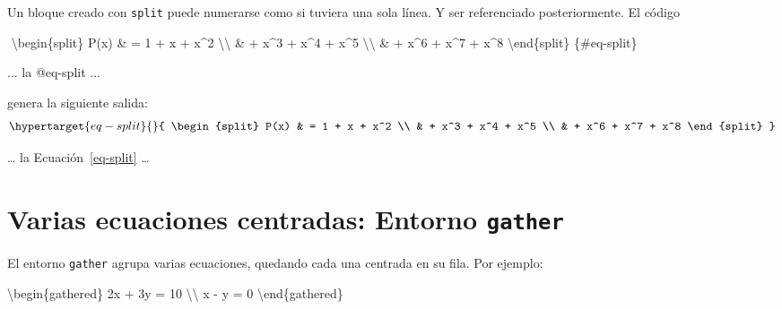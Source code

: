 \documentclass[
  letterpaper,
  DIV=11,
  numbers=noendperiod]{scrartcl}
\newenvironment{Shaded}{\begin{snugshade}}{\end{snugshade}}
\newcommand{\ExtensionTok}[1]{\textcolor[rgb]{0.00,0.23,0.31}{#1}}
\newcommand{\FunctionTok}[1]{\textcolor[rgb]{0.28,0.35,0.67}{#1}}
\newcommand{\KeywordTok}[1]{\textcolor[rgb]{0.00,0.23,0.31}{#1}}
\newcommand{\NormalTok}[1]{\textcolor[rgb]{0.00,0.23,0.31}{#1}}
\newcommand{\SpecialCharTok}[1]{\textcolor[rgb]{0.37,0.37,0.37}{#1}}
\newcommand{\SpecialStringTok}[1]{\textcolor[rgb]{0.13,0.47,0.30}{#1}}
\begin{document}
Un bloque creado con \texttt{split} puede numerarse como si tuviera una
sola línea. Y ser referenciado posteriormente. El código

\begin{Shaded}
\begin{Highlighting}[]
\SpecialStringTok{$$}
\KeywordTok{\textbackslash{}begin}\NormalTok{\{}\ExtensionTok{split}\NormalTok{\}}
\SpecialStringTok{P(x) \& = 1  + x + x\^{}2 }\SpecialCharTok{\textbackslash{}\textbackslash{}}
\SpecialStringTok{     \& + x\^{}3 + x\^{}4 + x\^{}5 }\SpecialCharTok{\textbackslash{}\textbackslash{}}
\SpecialStringTok{     \& + x\^{}6 + x\^{}7 + x\^{}8}
\KeywordTok{\textbackslash{}end}\NormalTok{\{}\ExtensionTok{split}\NormalTok{\}}
\SpecialStringTok{$$}\NormalTok{\{\#eq{-}split\}}

\NormalTok{... la @eq{-}split ...}
\end{Highlighting}
\end{Shaded}

genera la siguiente salida:
\begin{equation}\protect\hypertarget{eq-split}{}{
\begin{split}
P(x) & = 1  + x + x^2 \\
 & + x^3 + x^4 + x^5 \\
 & + x^6 + x^7 + x^8
\end{split}
}\label{eq-split}\end{equation}

\ldots{} la Ecuación~\ref{eq-split} \ldots{}

\hypertarget{varias-ecuaciones-centradas-entorno-gather}{%
\section{\texorpdfstring{Varias ecuaciones centradas: Entorno
\texttt{gather}}{Varias ecuaciones centradas: Entorno gather}}\label{varias-ecuaciones-centradas-entorno-gather}}

El entorno \texttt{gather} agrupa varias ecuaciones, quedando cada una
centrada en su fila. Por ejemplo:

\begin{Shaded}
\begin{Highlighting}[]
\KeywordTok{\textbackslash{}begin}\NormalTok{\{}\ExtensionTok{gathered}\NormalTok{\} }
\NormalTok{2x + 3y =  10 }\FunctionTok{\textbackslash{}\textbackslash{}} 
\NormalTok{x {-} y =  0}
\KeywordTok{\textbackslash{}end}\NormalTok{\{}\ExtensionTok{gathered}\NormalTok{\}}
\end{Highlighting}
\end{Shaded}
\end{document}
